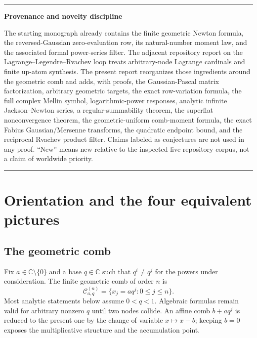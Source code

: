 \documentclass[11pt,a4paper,oneside]{article}
\theoremstyle{definition}
\theoremstyle{remark}
\newenvironment{statusbox}[1]{%
  \par\smallskip\noindent\begin{center}\begin{minipage}{0.94\textwidth}%
  \hrule\vspace{0.55em}\noindent\textbf{#1}\par\smallskip
}{%
  \vspace{0.55em}\hrule\end{minipage}\end{center}\smallskip
}
\newcommand{\C}{\mathbb C}
\newcommand{\sincpi}{\operatorname{sinc}_{\pi}}
\begin{document}
\begin{abstract}
Finally, the Fourier product
\[
 \widehat u_q(\xi)=\prod_{j\ge0}
 \sincpi\!\left(2(1-q)q^j\xi\right)
\]
is fed back through the same geometric filter.  Away from its zeros this gives
a rapidly convergent reciprocal-product expansion for $1/\widehat u_q$, with
an explicit factorial--Gaussian error bound.  The report also relates the
multiplicative Gaussian filter to dyadic Thue--Morse spline formulas, to exact
finite synthesis by shifted up-functions, and to a collection of concrete
formalization and research problems.  An accompanying Python program verifies
the finite identities exactly, computes Fabius moments through order $80$, and
reproduces all numerical figures.
\end{abstract}

\begin{statusbox}{Provenance and novelty discipline}
The starting monograph already contains the finite geometric Newton formula,
the reversed-Gaussian zero-evaluation row, its natural-number moment law, and
the associated formal power-series filter.  The adjacent repository report on
the Lagrange--Legendre--Rvachev loop treats arbitrary-node Lagrange cardinals
and finite up-atom synthesis.  The present report reorganizes those ingredients
around the geometric comb and adds, with proofs, the Gaussian-Pascal matrix
factorization, arbitrary geometric targets, the exact row-variation formula,
the full complex Mellin symbol, logarithmic-power responses, analytic infinite
Jackson--Newton series, a regular-summability theorem, the superflat
nonconvergence theorem, the geometric-uniform comb-moment formula, the exact
Fabius Gaussian/Mersenne transforms, the quadratic endpoint bound, and the
reciprocal Rvachev product filter.  Claims labeled as conjectures are not used
in any proof.  ``New'' means new relative to the inspected live repository
corpus, not a claim of worldwide priority.
\end{statusbox}

\clearpage
\tableofcontents
\clearpage

\section{Orientation and the four equivalent pictures}
\label{sec:orientation}

\subsection{The geometric comb}

Fix $a\in\C\setminus\{0\}$ and a base $q\in\C$ such that
$q^i\ne q^j$ for the powers under consideration.  The finite geometric comb
of order $n$ is
\[
 \mathcal C_{a,q}^{(n)}=\{x_j=aq^j:0\le j\le n\}.
\]
Most analytic statements below assume $0<q<1$.  Algebraic formulas remain
valid for arbitrary nonzero $q$ until two nodes collide.  An affine comb
$b+aq^j$ is reduced to the present one by the change of variable $x\mapsto
x-b$; keeping $b=0$ exposes the multiplicative structure and the accumulation
point.
\end{document}
